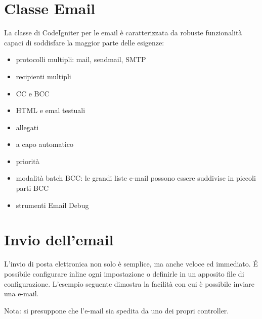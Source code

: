 \section{Classe Email}
\label{class:email}

La classe di CodeIgniter per le email è caratterizzata da robuste funzionalità capaci di soddisfare la maggior parte delle esigenze:

\begin{itemize}
\item protocolli multipli: mail, sendmail, SMTP
\item recipienti multipli
\item CC e BCC
\item HTML e emal testuali
\item allegati
\item a capo automatico
\item priorità
\item modalità batch BCC: le grandi liste e-mail possono essere suddivise in piccoli parti BCC
\item strumenti Email Debug
\end{itemize}

\section*{Invio dell'email}
L'invio di posta elettronica non solo è semplice, ma anche veloce ed immediato. \'E possibile configurare inline ogni impostazione o definirle in un apposito file di configurazione. L'esempio seguente dimostra la facilità con cui è possibile inviare una e-mail. 

Nota: si presuppone che l'e-mail sia spedita da uno dei propri controller.


